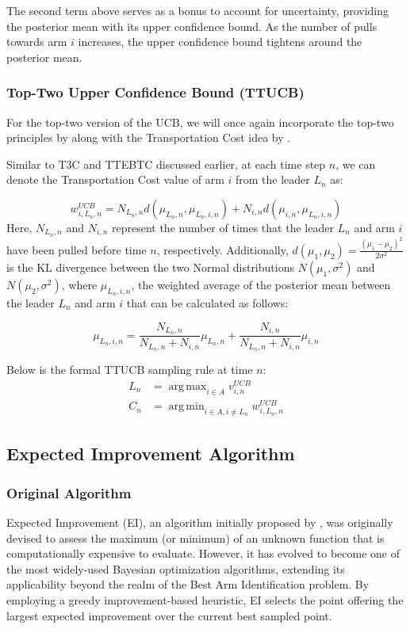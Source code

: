 \documentclass[a4paper, 12pt]{article}
\DeclareMathOperator{\argmax}{arg\,max}
\DeclareMathOperator{\argmin}{arg\,min}
\theoremstyle{definition}
\begin{document}
The second term above serves as a bonus to account for uncertainty, providing the posterior mean with its upper confidence bound. As the number of pulls towards arm $i$ increases, the upper confidence bound tightens around the posterior mean.

\subsubsection{Top-Two Upper Confidence Bound (TTUCB)}
For the top-two version of the UCB, we will once again incorporate the top-two principles by \cite{toptwo} along with the Transportation Cost idea by \cite{ttucb2}.

Similar to T3C and TTEBTC discussed earlier, at each time step $n$, we can denote the Transportation Cost value of arm $i$ from the leader $L_n$ as:

\[
w_{i,L_n,n}^{UCB} = N_{L_n,n} d(\mu_{L_n,n},\mu_{L_n,i,n})+ N_{i,n} d(\mu_{i,n},\mu_{L_n,i,n})     
\]
Here, $N_{L_n,n}$ and $N_{i,n}$ represent the number of times that the leader $L_n$ and arm $i$ have been pulled before time $n$, respectively. Additionally, $d(\mu_1,\mu_2) = \frac{(\mu_1 - \mu_2)^2}{2\sigma^2}$ is the KL divergence between the two Normal distributions $N(\mu_1,\sigma^2)$ and $N(\mu_2,\sigma^2)$, where $\mu_{L_n,i,n}$, the weighted average of the posterior mean between the leader $L_n$ and arm $i$ that can be calculated as follows:

\[
\mu_{L_n,i,n} = \frac{N_{L_n,n}}{N_{L_n,n}+N_{i,n}} \mu_{L_n,n} + \frac{N_{i,n}}{N_{L_n,n}+N_{i,n}} \mu_{i,n}  
\]

Below is the formal TTUCB sampling rule at time $n$:
\begin{align} \label{eq:ttucb}
L_n & = \argmax_{i\in A} v_{i,n}^{UCB} \nonumber \\
C_n & = \argmin_{i\in A,i\neq L_n} w_{i,L_n,n}^{UCB}
\end{align}


\subsection{Expected Improvement Algorithm}
\subsubsection{Original Algorithm}
Expected Improvement (EI), an algorithm initially proposed by \cite{expectedimprovement}, was originally devised to assess the maximum (or minimum) of an unknown function that is computationally expensive to evaluate. However, it has evolved to become one of the most widely-used Bayesian optimization algorithms, extending its applicability beyond the realm of the Best Arm Identification problem. By employing a greedy improvement-based heuristic, EI selects the point offering the largest expected improvement over the current best sampled point.
\end{document}
